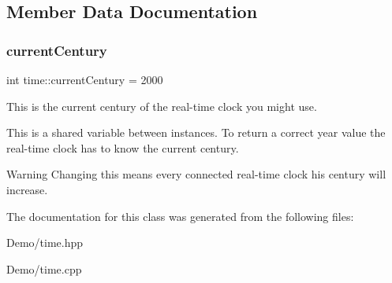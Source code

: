 \subsection{Member Data Documentation}
\mbox{\label{classtime_acab6780ebb25862cb83316cb967b8b57}} 
\subsubsection{\texorpdfstring{current\+Century}{currentCentury}}
{\footnotesize\ttfamily int time\+::current\+Century = 2000\hspace{0.3cm}{\ttfamily [static]}}



This is the current century of the real-\/time clock you might use. 

This is a shared variable between instances. To return a correct year value the real-\/time clock has to know the current century. \begin{DoxyWarning}{Warning}
Changing this means every connected real-\/time clock his century will increase. 
\end{DoxyWarning}


The documentation for this class was generated from the following files\+:\begin{DoxyCompactItemize}
\item 
Demo/time.\+hpp\item 
Demo/time.\+cpp\end{DoxyCompactItemize}
